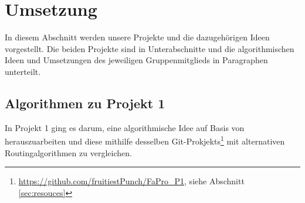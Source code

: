 \documentclass[sigconf, nonacm, review]{acmart}
\begin{document}
\section{Umsetzung}
In diesem Abschnitt werden unsere Projekte und die dazugeh\"origen Ideen vorgestellt.
Die beiden Projekte sind in Unterabschnitte und die algorithmischen Ideen und Umsetzungen des jeweiligen Gruppenmitglieds in Paragraphen unterteilt. 
\subsection{Algorithmen zu Projekt 1}
In Projekt 1 ging es darum, eine algorithmische Idee auf Basis von \cite{foerster2021} herauszuarbeiten und diese mithilfe desselben Git-Prokjekts\footnote{\url{https://github.com/fruitiestPunch/FaPro_P1}, siehe Abschnitt \ref{sec:resouces}} mit alternativen Routingalgorithmen zu vergleichen. 
\end{document}
